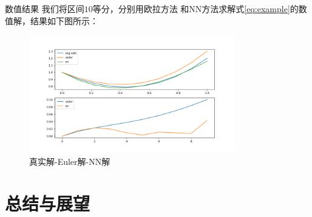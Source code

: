 \documentclass[hyperref,UTF8,11pt]{beamer}
\begin{document}
\begin{frame}{数值结果}
我们将区间$10$等分，分别用欧拉方法
和NN方法求解式\eqref{eq:example}的数值解，结果如下图所示：
    \begin{figure}
        \centering
        \includegraphics[width=0.8\textwidth]{./pic/ans.png}
        \caption{真实解-Euler解-NN解}\label{fig:ANS}
    \end{figure}

\end{frame}




\section{总结与展望}
\end{document}
